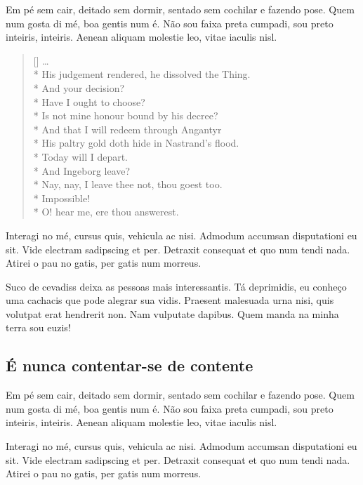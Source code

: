 Em pé sem cair, deitado sem dormir, sentado sem cochilar e fazendo pose. Quem
num gosta di mé, boa gentis num é. Não sou faixa preta cumpadi, sou preto
inteiris, inteiris. Aenean aliquam molestie leo, vitae iaculis nisl.

\settowidth{\versewidth}{Nay, nay, I leave thee not, thou goest too}
\begin{verse}[\versewidth]
\ldots \\*
His judgement rendered, he dissolved the Thing. \\*
 And your decision? \\*
 
Have I ought to choose? \\*
Is not mine honour bound by his decree? \\*
And that I will redeem through Angantyr \\*
His paltry gold doth hide in Nastrand’s flood. \\*
Today will I depart. \\*
 
And Ingeborg leave? \\*
 Nay, nay, I leave thee not,
thou goest too. \\*
 Impossible! \\*
 
O! hear me, ere thou answerest.
\end{verse}

Interagi no mé, cursus quis, vehicula ac nisi. Admodum accumsan disputationi eu
sit. Vide electram sadipscing et per. Detraxit consequat et quo num tendi nada.
Atirei o pau no gatis, per gatis num morreus.

Suco de cevadiss deixa as pessoas mais interessantis. Tá deprimidis, eu conheço
uma cachacis que pode alegrar sua vidis. Praesent malesuada urna nisi, quis
volutpat erat hendrerit non. Nam vulputate dapibus. Quem manda na minha terra
sou euzis!

\subsection{É nunca contentar-se de contente}

Em pé sem cair, deitado sem dormir, sentado sem cochilar e fazendo pose. Quem
num gosta di mé, boa gentis num é. Não sou faixa preta cumpadi, sou preto
inteiris, inteiris. Aenean aliquam molestie leo, vitae iaculis nisl.

Interagi no mé, cursus quis, vehicula ac nisi. Admodum accumsan disputationi eu
sit. Vide electram sadipscing et per. Detraxit consequat et quo num tendi nada.
Atirei o pau no gatis, per gatis num morreus.

